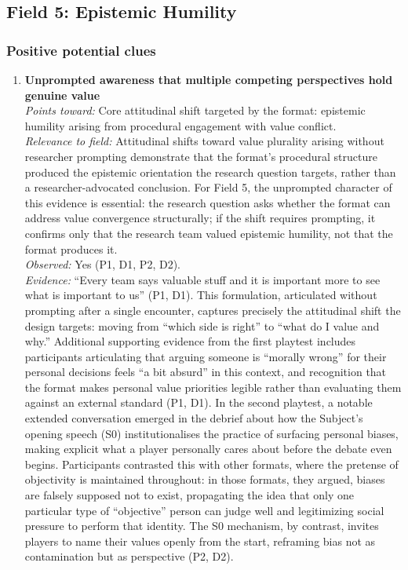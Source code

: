 \subsection*{Field 5: Epistemic Humility}

\subsubsection*{Positive potential clues}

\begin{enumerate}

\item \textbf{Unprompted awareness that multiple competing perspectives hold genuine value}\\
\textit{Points toward:} Core attitudinal shift targeted by the format: epistemic humility arising from procedural engagement with value conflict.\\
\textit{Relevance to field:} Attitudinal shifts toward value plurality arising without researcher prompting demonstrate that the format's procedural structure produced the epistemic orientation the research question targets, rather than a researcher-advocated conclusion. For Field 5, the unprompted character of this evidence is essential: the research question asks whether the format can address value convergence structurally; if the shift requires prompting, it confirms only that the research team valued epistemic humility, not that the format produces it.\\
\textit{Observed:} Yes (P1, D1, P2, D2).\\
\textit{Evidence:} ``Every team says valuable stuff and it is important more to see what is important to us'' (P1, D1). This formulation, articulated without prompting after a single encounter, captures precisely the attitudinal shift the design targets: moving from ``which side is right'' to ``what do I value and why.'' Additional supporting evidence from the first playtest includes participants articulating that arguing someone is ``morally wrong'' for their personal decisions feels ``a bit absurd'' in this context, and recognition that the format makes personal value priorities legible rather than evaluating them against an external standard (P1, D1). In the second playtest, a notable extended conversation emerged in the debrief about how the Subject's opening speech (S0) institutionalises the practice of surfacing personal biases, making explicit what a player personally cares about before the debate even begins. Participants contrasted this with other formats, where the pretense of objectivity is maintained throughout: in those formats, they argued, biases are falsely supposed not to exist, propagating the idea that only one particular type of ``objective'' person can judge well and legitimizing social pressure to perform that identity. The S0 mechanism, by contrast, invites players to name their values openly from the start, reframing bias not as contamination but as perspective (P2, D2).\\

\end{enumerate}
